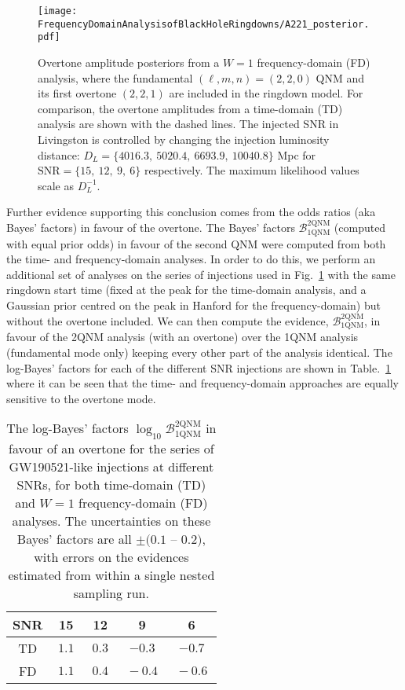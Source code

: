 \begin{figure}[t]
    \centering
    \texttt{[image: FrequencyDomainAnalysisofBlackHoleRingdowns/A221\_posterior.pdf]}
    \caption[Overtone amplitude posteriors from a $W=1$ frequency-domain analysis]{ 
    Overtone amplitude posteriors from a $W=1$ frequency-domain (FD) analysis, where the fundamental $(\ell,m,n) = (2,2,0)$ QNM and its first overtone $(2,2,1)$ are included in the ringdown model. For comparison, the overtone amplitudes from a time-domain (TD) analysis are shown with the dashed lines. The injected SNR in Livingston is controlled by changing the injection luminosity distance: $D_L = \{4016.3,\ 5020.4,\ 6693.9,\ 10040.8\}$ Mpc for $\mathrm{SNR} = \{15,\ 12,\ 9,\ 6\}$ respectively. The maximum likelihood values scale as $D_L^{-1}$.
    }
    \label{fig:A221_posterior}
\end{figure}

Further evidence supporting this conclusion comes from the odds ratios (aka Bayes' factors) in favour of the overtone.
The Bayes' factors $\mathcal{B}^{2\mathrm{QNM}}_{1\mathrm{QNM}}$ (computed with equal prior odds) in favour of the second QNM were computed from both the time- and frequency-domain analyses. 
In order to do this, we perform an additional set of analyses on the series of injections used in Fig.~\ref{fig:A221_posterior} with the same ringdown start time (fixed at the peak for the time-domain analysis, and a Gaussian prior centred on the peak in Hanford for the frequency-domain) but without the overtone included.
We can then compute the evidence, $\mathcal{B}_{1\mathrm{QNM}}^{2\mathrm{QNM}}$, in favour of the 2QNM analysis (with an overtone) over the 1QNM analysis (fundamental mode only) keeping every other part of the analysis identical. 
The log-Bayes' factors for each of the different SNR injections are shown in Table.~\ref{tab:bayes_factors} where it can be seen that the time- and frequency-domain approaches are equally sensitive to the overtone mode.

\begin{table}[h!]
    \centering
    \begin{tabular}{c|cccc}
    SNR & 15   & 12   & 9   & 6  \\ \hline
    TD & $~ 1.1 ~$ & $0.3$ & $-0.3$ & $-0.7$ \\
    FD & $~ 1.1 ~$ & $~ 0.4 ~$ & $~ -0.4 ~ $ & $~ -0.6 ~$   
    \end{tabular}
    \caption[The log-Bayes' factors in favour of an overtone for the series of GW190521-like injections at different SNRs, for both time-domain and $W=1$ frequency-domain analyses]{ 
    The log-Bayes' factors $\log_{10}\mathcal{B}^{2\mathrm{QNM}}_{1\mathrm{QNM}}$ in favour of an overtone for the series of GW190521-like injections at different SNRs, for both time-domain (TD) and $W=1$ frequency-domain (FD) analyses. 
    The uncertainties on these Bayes' factors are all $\pm (0.1$ -- $0.2)$, with errors on the evidences estimated from within a single nested sampling run.
    }
    \label{tab:bayes_factors}
\end{table}


